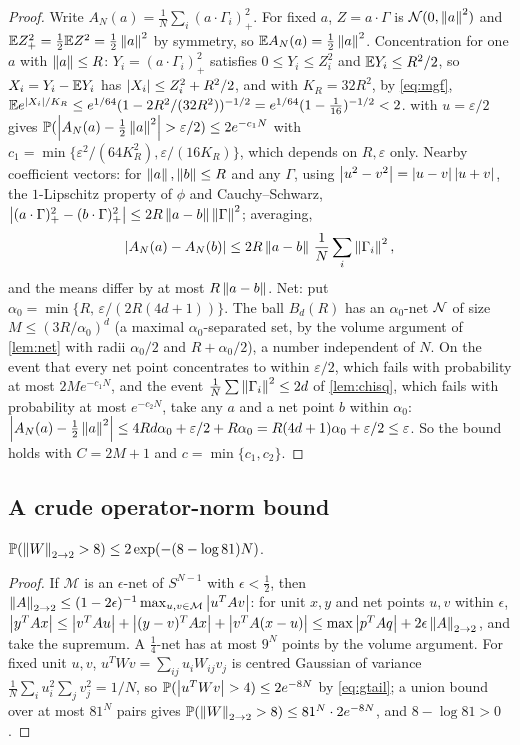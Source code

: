 \begin{proof}
Write $A_N(a)=\frac1N\sum_i(a\cdot\Gamma_i)_+^2$. For fixed $a$, $Z=a\cdot\Gamma$ is $\mathcal N(0,\left\lVert a\right\rVert^2)$ and $\mathbb{E} Z_+^2=\tfrac12\mathbb{E} Z^2=\tfrac12\left\lVert a\right\rVert^2$ by symmetry, so $\mathbb{E} A_N(a)=\tfrac12\left\lVert a\right\rVert^2$. Concentration for one $a$ with $\left\lVert a\right\rVert\le R$: $Y_i=(a\cdot\Gamma_i)_+^2$ satisfies $0\le Y_i\le Z_i^2$ and $\mathbb{E} Y_i\le R^2/2$, so $X_i=Y_i-\mathbb{E} Y_i$ has $\left\lvert X_i\right\rvert\le Z_i^2+R^2/2$, and with $K_R=32R^2$, by \cref{eq:mgf}, $\mathbb{E} e^{\left\lvert X_i\right\rvert/K_R}\le e^{1/64}(1-2R^2/(32R^2))^{-1/2}=e^{1/64}(1-\tfrac1{16})^{-1/2}<2$.  with $u=\varepsilon/2$ gives $\mathbb{P}(\left\lvert A_N(a)-\tfrac12\left\lVert a\right\rVert^2\right\rvert>\varepsilon/2)\le2e^{-c_1N}$ with $c_1=\min\{\varepsilon^2/(64K_R^2),\varepsilon/(16K_R)\}$, which depends on $R,\varepsilon$ only. Nearby coefficient vectors: for $\left\lVert a\right\rVert,\left\lVert b\right\rVert\le R$ and any $\Gamma$, using $\left\lvert u^2-v^2\right\rvert=\left\lvert u-v\right\rvert\left\lvert u+v\right\rvert$, the $1$-Lipschitz property of $\phi$ and Cauchy--Schwarz, $\left\lvert (a\cdot\Gamma)_+^2-(b\cdot\Gamma)_+^2\right\rvert\le2R\left\lVert a-b\right\rVert\left\lVert \Gamma\right\rVert^2$; averaging,
\[
\left\lvert A_N(a)-A_N(b)\right\rvert\le2R\left\lVert a-b\right\rVert\,\frac1N\sum_i\left\lVert \Gamma_i\right\rVert^2,
\]
and the means differ by at most $R\left\lVert a-b\right\rVert$. Net: put $\alpha_0=\min\{R,\,\varepsilon/(2R(4d+1))\}$. The ball $B_d(R)$ has an $\alpha_0$-net $\mathcal{N}$ of size $M\le(3R/\alpha_0)^d$ (a maximal $\alpha_0$-separated set, by the volume argument of \cref{lem:net} with radii $\alpha_0/2$ and $R+\alpha_0/2$), a number independent of $N$. On the event that every net point concentrates to within $\varepsilon/2$, which fails with probability at most $2Me^{-c_1N}$, and the event $\frac1N\sum\left\lVert \Gamma_i\right\rVert^2\le2d$ of \cref{lem:chisq}, which fails with probability at most $e^{-c_2N}$, take any $a$ and a net point $b$ within $\alpha_0$: $\left\lvert A_N(a)-\tfrac12\left\lVert a\right\rVert^2\right\rvert\le4Rd\alpha_0+\varepsilon/2+R\alpha_0=R(4d+1)\alpha_0+\varepsilon/2\le\varepsilon$. So the bound holds with $C=2M+1$ and $c=\min\{c_1,c_2\}$.
\end{proof}

\subsection{A crude operator-norm bound}

\begin{lemma}\label{lem:opnorm}
$\mathbb{P}(\left\lVert W\right\rVert_{2\to 2}>8)\le2\exp(-(8-\log81)N)$.
\end{lemma}

\begin{proof}
If $\mathcal M$ is an $\epsilon$-net of $S^{N-1}$ with $\epsilon<\tfrac12$, then $\left\lVert A\right\rVert_{2\to 2}\le(1-2\epsilon)^{-1}\max_{u,v\in\mathcal M}\left\lvert u^TAv\right\rvert$: for unit $x,y$ and net points $u,v$ within $\epsilon$, $\left\lvert y^TAx\right\rvert\le\left\lvert v^TAu\right\rvert+\left\lvert (y-v)^TAx\right\rvert+\left\lvert v^TA(x-u)\right\rvert\le\max\left\lvert p^TAq\right\rvert+2\epsilon\left\lVert A\right\rVert_{2\to 2}$, and take the supremum. A $\tfrac14$-net has at most $9^N$ points by the volume argument. For fixed unit $u,v$, $u^TWv=\sum_{ij}u_iW_{ij}v_j$ is centred Gaussian of variance $\frac1N\sum_iu_i^2\sum_jv_j^2=1/N$, so $\mathbb{P}(\left\lvert u^TWv\right\rvert>4)\le2e^{-8N}$ by \cref{eq:gtail}; a union bound over at most $81^N$ pairs gives $\mathbb{P}(\left\lVert W\right\rVert_{2\to 2}>8)\le81^N\cdot2e^{-8N}$, and $8-\log81>0$.
\end{proof}

